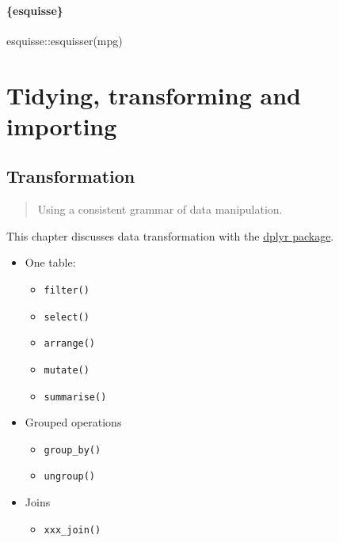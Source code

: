 \documentclass[]{book}
\newenvironment{Shaded}{}{}
\newcommand{\KeywordTok}[1]{\textcolor[rgb]{0.00,0.00,1.00}{#1}}
\newcommand{\NormalTok}[1]{#1}
\newcommand{\OperatorTok}[1]{#1}
\providecommand{\tightlist}{%
  \setlength{\itemsep}{0pt}\setlength{\parskip}{0pt}}
\begin{document}
\hypertarget{esquisse}{%
\subsection{\{esquisse\}}\label{esquisse}}

\begin{Shaded}
\begin{Highlighting}[]
\NormalTok{esquisse}\OperatorTok{::}\KeywordTok{esquisser}\NormalTok{(mpg)}
\end{Highlighting}
\end{Shaded}

\hypertarget{part-tidying-transforming-and-importing}{%
\part{Tidying, transforming and importing}\label{part-tidying-transforming-and-importing}}

\hypertarget{transformation}{%
\chapter{Transformation}\label{transformation}}

\begin{quote}
Using a consistent grammar of data manipulation.
\end{quote}

This chapter discusses data transformation with the \href{https://dplyr.tidyverse.org/}{dplyr package}.

\begin{itemize}
\tightlist
\item
  One table:

  \begin{itemize}
  \tightlist
  \item
    \texttt{filter()}
  \item
    \texttt{select()}
  \item
    \texttt{arrange()}
  \item
    \texttt{mutate()}
  \item
    \texttt{summarise()}
  \end{itemize}
\item
  Grouped operations

  \begin{itemize}
  \tightlist
  \item
    \texttt{group\_by()}
  \item
    \texttt{ungroup()}
  \end{itemize}
\item
  Joins

  \begin{itemize}
  \tightlist
  \item
    \texttt{xxx\_join()}
  \end{itemize}
\end{itemize}
\end{document}
